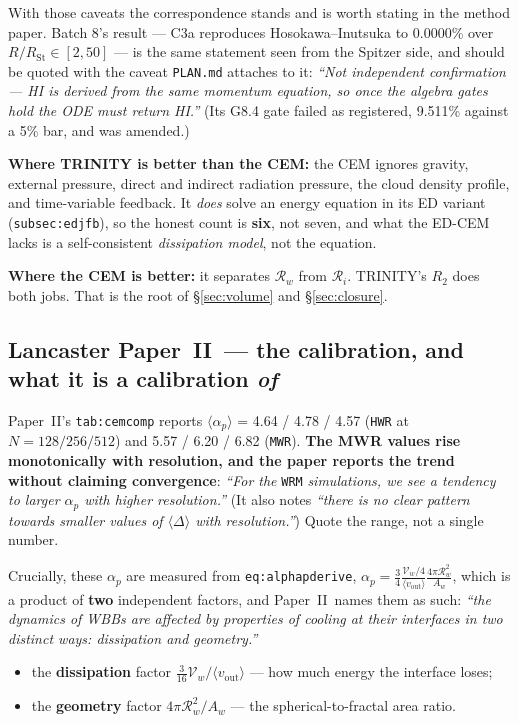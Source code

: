\documentclass[11pt,a4paper,oneside]{report}
\newcommand{\brkus}{\textunderscore\allowbreak}
\newcommand{\code}[1]{\texttt{\small\let\_\brkus #1}}
\newcommand{\lbl}[1]{\texttt{\footnotesize\let\_\brkus #1}}
\newcommand{\PII}{Paper~II}
\newcommand{\Rw}{\mathcal{R}_{w}}
\newcommand{\Ri}{\mathcal{R}_{i}}
\newcommand{\RSt}{R_{\mathrm{St}}}
\newcommand{\ap}{\alpha_p}
\newcommand{\Vw}{\mathcal{V}_w}
\newcommand{\up}[1]{\textcolor{tqaccent}{\textbf{#1}}}
\begin{document}
With those caveats the correspondence stands and is worth stating in the method paper.
Batch 8's result --- C3a reproduces Hosokawa--Inutsuka to 0.0000\% over $R/\RSt\in[2,50]$ --- is
the same statement seen from the Spitzer side, and should be quoted with the caveat \code{PLAN.md}
attaches to it: \emph{``Not independent confirmation --- HI is derived from the same momentum
equation, so once the algebra gates hold the ODE must return HI.''} (Its G8.4 gate failed as
registered, 9.511\% against a 5\% bar, and was amended.)

\medskip
\textbf{Where TRINITY is better than the CEM:} the CEM ignores gravity, external pressure,
direct and indirect radiation pressure, the cloud density profile, and time-variable
feedback. It \emph{does} solve an energy equation in its ED variant
(\lbl{subsec:ed\_jfb}), so the honest count is \up{six}, not seven, and what the ED-CEM
lacks is a self-consistent \emph{dissipation model}, not the equation.

\textbf{Where the CEM is better:} it separates $\Rw$ from $\Ri$. TRINITY's $R_2$ does both
jobs. That is the root of \S\ref{sec:volume} and \S\ref{sec:closure}.

\subsection{Lancaster \PII\ --- the calibration, and what it is a calibration \emph{of}}
\label{sec:lanc2}

\PII's \lbl{tab:cem\_comp} reports $\langle\ap\rangle$ = 4.64 / 4.78 / 4.57 (\code{HWR} at
$N=128/256/512$) and 5.57 / 6.20 / 6.82 (\code{MWR}). \up{The MWR values rise monotonically with
resolution, and the paper reports the trend without claiming convergence}: \emph{``For the}
\code{WRM} \emph{simulations, we see a tendency to larger $\ap$ with higher resolution.''} (It also
notes \emph{``there is no clear pattern towards smaller values of $\langle\Delta\rangle$ with
resolution.''}) Quote the range, not a single number.

Crucially, these $\ap$ are measured from \lbl{eq:alphap\_derive},
$\ap = \tfrac34\frac{\Vw/4}{\langle v_{\mathrm{out}}\rangle}\frac{4\pi\Rw^2}{A_w}$, which is a
product of \up{two} independent factors, and \PII\ names them as such: \emph{``the dynamics of WBBs
are affected by properties of cooling at their interfaces in two distinct ways: dissipation and
geometry.''}

\begin{itemize}
\item the \textbf{dissipation} factor $\tfrac{3}{16}\Vw/\langle v_{\mathrm{out}}\rangle$ --- how much
      energy the interface loses;
\item the \textbf{geometry} factor $4\pi\Rw^2/A_w$ --- the spherical-to-fractal area ratio.
\end{itemize}
\end{document}
